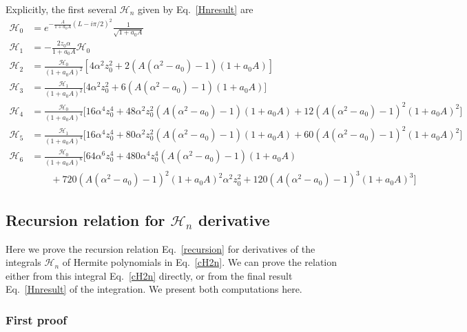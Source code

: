 \documentclass[a4,letterpaper,11pt]{article}
\newcommand{\nn}{\nonumber}
\newcommand{\minus}{\!-\!}
\newcommand{\plus}{\!+\!}
\newcommand{\cH}{\mathcal{H}}
\newcommand{\eq}[1]{Eq.~\eqref{#1}}
\begin{document}
Explicitly, the first several $\cH_n$ given by \eq{Hnresult} are
\begin{align}
\label{Hnexplicit}
\cH_0 &= e^{-\frac{A}{1+a_0 A}(L-i\pi/2)^2} \frac{1}{\sqrt{1+a_0 A}}  \\
\cH_1 &= - \frac{2z_0\alpha}{1+a_0 A}\cH_0 \nn \\
\cH_2 &=  \frac{\cH_0}{(1+a_0 A)^2} [ 4\alpha^2 z_0^2 + 2(A(\alpha^2-a_0) - 1 )(1+a_0 A)]  \nn \\
\cH_3 &= \frac{\cH_1}{(1+a_0 A)^2} \biggl[ 4 \alpha^2 z_0^2 + 6(A(\alpha^2-a_0) - 1)(1+a_0 A)\biggr]  \nn \\
\cH_4 &= \frac{\cH_0}{(1+a_0 A)^4} \biggl[ 16 \alpha^4 z_0^4 + 48 \alpha^2 z_0^2 (A(\alpha^2 \minus a_0) - 1)(1\plus a_0 A)   + 12(A(\alpha^2\minus a_0) - 1)^2 (1\plus a_0 A)^2\biggr]  \nn \\
\cH_5 &= \frac{\cH_1}{(1+a_0 A)^4} \biggl[ 16 \alpha^4 z_0^4 + 80 \alpha^2 z_0^2 (A(\alpha^2\minus a_0) - 1)(1\plus a_0 A) + 60 (A(\alpha^2\minus a_0) - 1)^2(1\plus a_0 A)^2\biggr] \nn \\
\cH_6 &= \frac{\cH_0}{(1+a_0 A)^6} \biggl[ 64 \alpha^6 z_0^4 + 480 \alpha^4 z_0^4 (A(\alpha^2\minus a_0) - 1)(1\plus a_0 A) \nn\\
&\qquad + 720 (A(\alpha^2\minus a_0) - 1)^2(1\plus a_0 A)^2\alpha^2 z_0^2+ 120 (A(\alpha^2\minus a_0) - 1)^3(1\plus a_0 A)^3\biggr]\nn
\end{align}


\subsection{Recursion relation for $\mathcal{H}_n$ derivative}
\label{app:Hderivative}

Here we prove the recursion relation \eq{recursion} for derivatives of the integrals $\cH_n$ of Hermite polynomials in \eq{cH2n}. We can prove the relation either from this integral \eq{cH2n} directly, or from the final result \eq{Hnresult} of the integration. We present both computations here.

\subsubsection{First proof}
\end{document}
